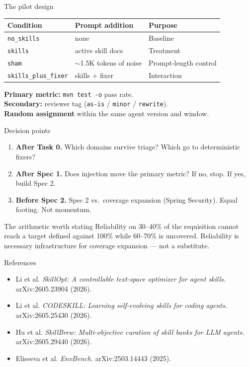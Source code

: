 \documentclass[aspectratio=169,11pt]{beamer}
\begin{document}
\begin{frame}{The pilot design}
  \begin{table}
  \centering
  \small
  \begin{tabular}{@{}lll@{}}
  \toprule
  Condition & Prompt addition & Purpose \\
  \midrule
  \texttt{no\_skills} & none & Baseline \\
  \texttt{skills} & active skill docs & Treatment \\
  \texttt{sham} & $\sim$1.5K tokens of noise & Prompt-length control \\
  \texttt{skills\_plus\_fixer} & skills + fixer & Interaction \\
  \bottomrule
  \end{tabular}
  \end{table}

  \vspace{0.6em}
  \textbf{Primary metric:} \texttt{mvn test -o} pass rate.\\
  \textbf{Secondary:} reviewer tag (\texttt{as-is} / \texttt{minor} /
  \texttt{rewrite}).\\
  \textbf{Random assignment} within the same agent version and window.
\end{frame}

\begin{frame}{Decision points}
  \begin{enumerate}
    \item \textbf{After Task 0.} Which domains survive triage? Which
    go to deterministic fixers?
    \item \textbf{After Spec 1.} Does injection move the primary metric?
    If no, stop. If yes, build Spec 2.
    \item \textbf{Before Spec 2.} Spec 2 vs.\ coverage expansion
    (Spring Security). Equal footing. Not momentum.
  \end{enumerate}

  \vspace{0.8em}
  \begin{block}{The arithmetic worth stating}
  \small
  Reliability on 30--40\% of the requisition cannot reach a target
  defined against 100\% while 60--70\% is uncovered. Reliability is
  necessary infrastructure for coverage expansion --- not a substitute.
  \end{block}
\end{frame}

\begin{frame}{References}
  \small
  \begin{itemize}
    \item Li et al. \emph{SkillOpt: A controllable text-space optimizer
    for agent skills.} arXiv:2605.23904 (2026).
    \item Li et al. \emph{CODESKILL: Learning self-evolving skills for
    coding agents.} arXiv:2605.25430 (2026).
    \item Hu et al. \emph{SkillBrew: Multi-objective curation of skill
    banks for LLM agents.} arXiv:2605.29440 (2026).
    \item Eliseeva et al. \emph{EnvBench.} arXiv:2503.14443 (2025).
  \end{itemize}
\end{frame}
\end{document}
